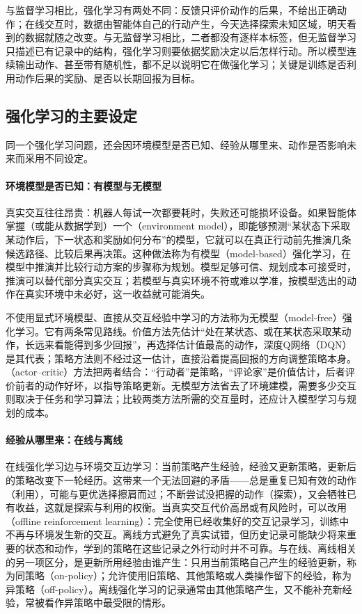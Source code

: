 与监督学习相比，强化学习有两处不同：反馈只评价动作的后果，不给出正确动作；在线交互时，数据由智能体自己的行动产生，今天选择探索未知区域，明天看到的数据就随之改变。与无监督学习相比，二者都没有逐样本标签，但无监督学习只描述已有记录中的结构，强化学习则要依据奖励决定以后怎样行动。所以模型连续输出动作、甚至带有随机性，都不足以说明它在做强化学习；关键是训练是否利用动作后果的奖励、是否以长期回报为目标。

\subsection{强化学习的主要设定}

同一个强化学习问题，还会因环境模型是否已知、经验从哪里来、动作是否影响未来而采用不同设定。

\paragraph{环境模型是否已知：有模型与无模型}

真实交互往往昂贵：机器人每试一次都要耗时，失败还可能损坏设备。如果智能体掌握（或能从数据学到）一个（environment model），即能够预测“某状态下采取某动作后，下一状态和奖励如何分布”的模型，它就可以在真正行动前先推演几条候选路径、比较后果再决策。这种做法称为有模型（model-based）强化学习，在模型中推演并比较行动方案的步骤称为规划。模型足够可信、规划成本可接受时，推演可以替代部分真实交互；若模型与真实环境不符或难以学准，按模型选出的动作在真实环境中未必好，这一收益就可能消失。

不使用显式环境模型、直接从交互经验中学习的方法称为无模型（model-free）强化学习。它有两条常见路线。价值方法先估计“处在某状态、或在某状态采取某动作，长远来看能得到多少回报”，再选择估计值最高的动作，深度Q网络（DQN）是其代表；策略方法则不经过这一估计，直接沿着提高回报的方向调整策略本身。（actor--critic）方法把两者结合：“行动者”是策略，“评论家”是价值估计，后者评价前者的动作好坏，以指导策略更新。无模型方法省去了环境建模，需要多少交互则取决于任务和学习算法；比较两类方法所需的交互量时，还应计入模型学习与规划的成本。

\paragraph{经验从哪里来：在线与离线}

在线强化学习边与环境交互边学习：当前策略产生经验，经验又更新策略，更新后的策略改变下一轮经历。这带来一个无法回避的矛盾——总是重复已知有效的动作（利用），可能与更优选择擦肩而过；不断尝试没把握的动作（探索），又会牺牲已有收益，这就是探索与利用的权衡。当真实交互代价高昂或有风险时，可以改用（offline reinforcement learning）：完全使用已经收集好的交互记录学习，训练中不再与环境发生新的交互。离线方式避免了真实试错，但历史记录可能缺少将来重要的状态和动作，学到的策略在这些记录之外行动时并不可靠。与在线、离线相关的另一项区分，是更新所用经验由谁产生：只用当前策略自己产生的经验更新，称为同策略（on-policy）；允许使用旧策略、其他策略或人类操作留下的经验，称为异策略（off-policy）。离线强化学习的记录通常由其他策略产生，又不能补充新经验，常被看作异策略中最受限的情形。

